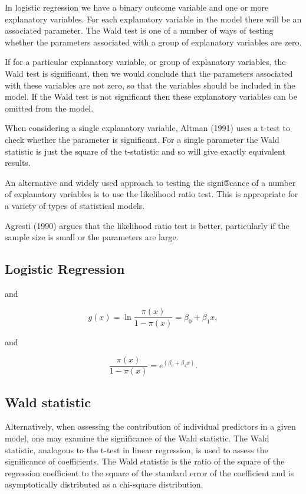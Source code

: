 \documentclass[a4paper,12pt]{article}
\begin{document}
In logistic regression we have a binary outcome variable and one or more explanatory variables. For each explanatory variable in the model there will be an associated parameter. The Wald test is one of a number of ways of testing whether the parameters associated with a group of explanatory variables are zero.

If for a particular explanatory variable, or group of explanatory variables, the Wald test is significant, then we would conclude that the parameters associated with these variables are not zero, so that the variables should be included in the model. If the Wald test is not significant then these explanatory variables can be omitted from the model. 

When considering a single explanatory variable, Altman (1991) uses a t-test to check whether the parameter is significant. For a single parameter the Wald statistic is just the square of the t-statistic and so will give exactly equivalent results.

An alternative and widely used approach to testing the signi®cance of a number of explanatory variables is to use the likelihood ratio test. This is appropriate for a variety of types of statistical models. 

Agresti (1990) argues that the likelihood ratio test is better, particularly if the sample size is small or the parameters are large.

\subsection{Logistic Regression}

and

\[g(x) = \ln \frac {\pi(x)} {1 - \pi(x)} = \beta_0 + \beta_1 x ,\]

and

\[\frac{\pi(x)} {1 - \pi(x)} = e^{(\beta_0 + \beta_1 x)}.\]

\subsection{Wald statistic}

Alternatively, when assessing the contribution of individual predictors in a given model, one may examine the significance of the Wald statistic. The Wald statistic, analogous to the t-test in linear regression, is used to assess the significance of coefficients. The Wald statistic is the ratio of the square of the regression coefficient to the square of the standard error of the coefficient and is asymptotically distributed as a chi-square distribution.
\end{document}
